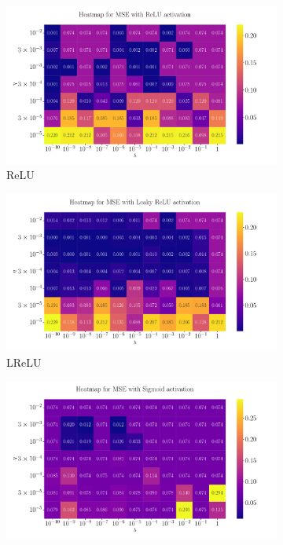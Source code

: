 \documentclass[%
reprint,s
amsmath,amssymb,
aps,
]{revtex4-2}
\begin{document}
\begin{figure}[ht!]
	\begin{subfigure}{0.4353\textwidth}
		\includegraphics[width=\textwidth]{Python/Figures/Heatmap_MSE_ReLU_Franke_Epochs250.pdf}
		\caption{ReLU}
	\end{subfigure}
	\hfill
	\begin{subfigure}{0.4353\textwidth}
		\includegraphics[width=\textwidth]{Python/Figures/Heatmap_MSE_Leaky ReLU_Franke_Epochs250.pdf}
		\caption{LReLU}
	\end{subfigure}
	\hfill\newline
	\begin{subfigure}{0.4353\textwidth}
		\includegraphics[width=\textwidth]{Python/Figures/Heatmap_MSE_Sigmoid_Franke_Epochs250.pdf}

\end{subfigure}
\end{figure}
\end{document}
